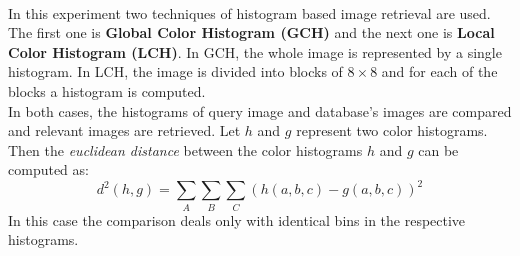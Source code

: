 \documentclass[pstricks,10pt,notitlepage]{report}
\begin{document}
\\
In this experiment two techniques of histogram based image retrieval are used. The first one is \textbf{Global Color Histogram (GCH)} and the next one is \textbf{Local Color Histogram (LCH)}. In GCH, the whole image is represented by a single histogram. In LCH, the image is divided into blocks of $8\times8$ and for each of the blocks a histogram is computed.\\
In both cases, the histograms of query image and database’s images are compared and relevant images are retrieved. Let $h$ and $g$ represent two color histograms. Then the \textit{euclidean distance} between the color histograms $h$ and $g$ can be computed as: 
\begin{equation}
d^2(h,g)=\sum_A\sum_B\sum_C(h(a,b,c)-g(a,b,c))^2\label{eq:7}
\end{equation}
In this case the comparison deals only with identical bins in the respective histograms.
\end{document}
